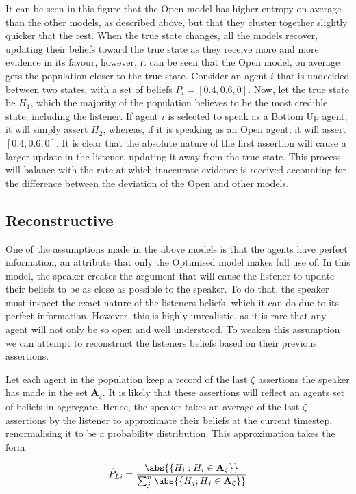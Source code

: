 It can be seen in this figure that the Open model has higher entropy on average than the other models, as described above, but that they cluster together slightly quicker that the rest. When the true state changes, all the models recover, updating their beliefs toward the true state as they receive more and more evidence in its favour, however, it can be seen that the Open model, on average gets the population closer to the true state. Consider an agent $i$ that is undecided between two states, with a set of beliefs $P_{i} = [0.4, 0.6, 0]$. Now, let the true state be $H_1$, which the majority of the population believes to be the most credible state, including the listener. If agent $i$ is selected to speak as a Bottom Up agent, it will simply assert $H_2$, whereas, if it is speaking as an Open agent, it will assert $[0.4, 0.6, 0]$. It is clear that the absolute nature of the first assertion will cause a larger update in the listener, updating it away from the true state. This process will balance with the rate at which inaccurate evidence is received accounting for the difference between the deviation of the Open and other models.


\subsection{Reconstructive}

One of the assumptions made in the above models is that the agents have perfect information, an attribute that only the Optimised model makes full use of. In this model, the speaker creates the argument that will cause the listener to update their beliefs to be as close as possible to the speaker. To do that, the speaker must inspect the exact nature of the listeners beliefs, which it can do due to its perfect information. However, this is highly unrealistic, as it is rare that any agent will not only be so open and well understood. To weaken this assumption we can attempt to reconstruct the listeners beliefs based on their previous assertions.

Let each agent in the population keep a record of the last $\zeta$ assertions the speaker has made in the set $\mathbf{A}_\zeta$. It is likely that these assertions will reflect an agents set of beliefs in aggregate. Hence, the speaker takes an average of the last $\zeta$ assertions by the listener to approximate their beliefs at the current timestep, renormalising it to be a probability distribution. This approximation takes the form

\begin{equation} \label{eq:reconstructive}
    \hat{P}_{Li} = \frac{\abs{ \{H_i: H_i \in \mathbf{A}_\zeta \} } }{ \sum_j^n \abs{ \{ H_j; H_j \in \mathbf{A}_\zeta \} }   }
\end{equation}

